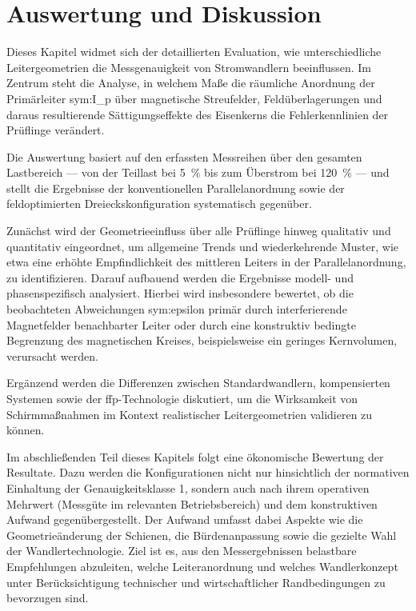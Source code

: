 

\section{Auswertung und Diskussion}
\label{sec:auswertung_diskussion}

Dieses Kapitel widmet sich der detaillierten Evaluation, wie unterschiedliche Leitergeometrien die Messgenauigkeit von Stromwandlern beeinflussen. Im Zentrum steht die Analyse, in welchem Maße die räumliche Anordnung der Primärleiter \gls{sym:I_p} über magnetische Streufelder, Feldüberlagerungen und daraus resultierende Sättigungseffekte des Eisenkerns die Fehlerkennlinien der Prüflinge verändert.



Die Auswertung basiert auf den erfassten Messreihen über den gesamten Lastbereich — von der Teillast bei \SI{5}{\percent} bis zum Überstrom bei \SI{120}{\percent} — und stellt die Ergebnisse der konventionellen Parallelanordnung sowie der feldoptimierten Dreieckskonfiguration systematisch gegenüber.

Zunächst wird der Geometrieeinfluss über alle Prüflinge hinweg qualitativ und quantitativ eingeordnet, um allgemeine Trends und wiederkehrende Muster, wie etwa eine erhöhte Empfindlichkeit des mittleren Leiters in der Parallelanordnung, zu identifizieren. Darauf aufbauend werden die Ergebnisse modell- und phasenspezifisch analysiert. Hierbei wird insbesondere bewertet, ob die beobachteten Abweichungen \gls{sym:epsilon} primär durch interferierende Magnetfelder benachbarter Leiter oder durch eine konstruktiv bedingte Begrenzung des magnetischen Kreises, beispielsweise ein geringes Kernvolumen, verursacht werden.



Ergänzend werden die Differenzen zwischen Standardwandlern, kompensierten Systemen sowie der \gls{ffp}-Technologie diskutiert, um die Wirksamkeit von Schirmmaßnahmen im Kontext realistischer Leitergeometrien validieren zu können.

Im abschließenden Teil dieses Kapitels folgt eine ökonomische Bewertung der Resultate. Dazu werden die Konfigurationen nicht nur hinsichtlich der normativen Einhaltung der Genauigkeitsklasse \num{1}, sondern auch nach ihrem operativen Mehrwert (Messgüte im relevanten Betriebsbereich) und dem konstruktiven Aufwand gegenübergestellt. Der Aufwand umfasst dabei Aspekte wie die Geometrieänderung der Schienen, die Bürdenanpassung sowie die gezielte Wahl der Wandlertechnologie. Ziel ist es, aus den Messergebnissen belastbare Empfehlungen abzuleiten, welche Leiteranordnung und welches Wandlerkonzept unter Berücksichtigung technischer und wirtschaftlicher Randbedingungen zu bevorzugen sind.



